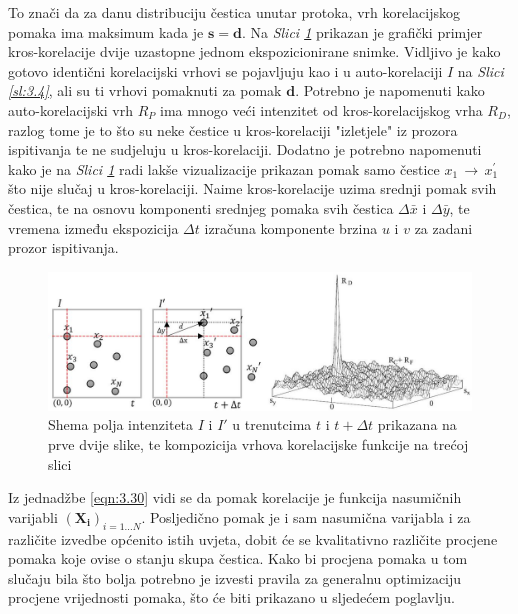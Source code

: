 To znači da za danu distribuciju čestica unutar protoka, vrh korelacijskog pomaka ima maksimum kada je $\boldsymbol{s}=\boldsymbol{d}$. Na \textit{Slici \ref{sl:3.5}} prikazan je grafički primjer kros-korelacije dvije uzastopne jednom ekspozicionirane snimke. Vidljivo je kako gotovo identični korelacijski vrhovi se pojavljuju kao i u auto-korelaciji $I$ na \textit{Slici \ref{sl:3.4}}, ali su ti vrhovi pomaknuti za pomak $\boldsymbol{d}$. Potrebno je napomenuti kako auto-korelacijski vrh $R_{P}$ ima mnogo veći intenzitet od kros-korelacijskog vrha $R_{D}$, razlog tome je to što su neke čestice u kros-korelaciji "izletjele" iz prozora ispitivanja te ne sudjeluju u kros-korelaciji. Dodatno je potrebno napomenuti kako je na \textit{Slici \ref{sl:3.5}} radi lakše vizualizacije prikazan pomak samo čestice $x_{1}\, \rightarrow \, x_{1}^{'}$ što nije slučaj u kros-korelaciji. Naime kros-korelacije uzima srednji pomak svih čestica, te na osnovu komponenti srednjeg pomaka svih čestica $\Delta \bar{x}$ i $\Delta \bar{y}$, te vremena između ekspozicija $\Delta t$ izračuna komponente brzina $u$ i $v$ za zadani prozor ispitivanja.
\begin{figure}[h]  
	\centering
	\includegraphics[width=16cm]{./3_MatPozadina/3_5KrosKorelacija.jpg} 
	\caption{Shema polja intenziteta $I$ i $I'$ u trenutcima $t$ i $t + \Delta t$ prikazana na prve dvije slike, te kompozicija vrhova korelacijske funkcije na trećoj slici \cite{raffel2018_book}}
	\label{sl:3.5}
\end{figure}
\par
Iz jednadžbe \ref{eqn:3.30} vidi se da pomak korelacije je funkcija nasumičnih varijabli $(\boldsymbol{X_{i}})_{i=1\dots N}$. Posljedično pomak je i sam nasumična varijabla i za različite izvedbe općenito istih uvjeta, dobit će se kvalitativno različite procjene pomaka koje ovise o stanju skupa čestica. Kako bi procjena pomaka u tom slučaju bila što bolja potrebno je izvesti pravila za generalnu optimizaciju procjene vrijednosti pomaka, što će biti prikazano u sljedećem poglavlju.
\FloatBarrier
